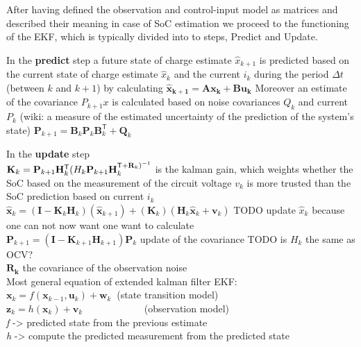 After having defined the observation and control-input model as matrices and described their meaning in case of SoC estimation we proceed to the functioning of the EKF, which is typically divided into to steps, Predict and Update. 

In the \textbf{predict} step a future state of charge estimate  $\hat x_{k+1}$ is predicted based on the current state of charge estimate $\hat x_k$ and the current $i_k$ during the period $\Delta t$ (between $k$ and $k+1$) by calculating $ \mathbf{\hat x_{k+1}=Ax_{k}+Bu_{k}} $ Moreover an estimate of the covariance $P_{k+1}x$ is calculated based on noise covariances $Q_k$ and current $P_k$ (wiki: a measure of the estimated uncertainty of the prediction of the system's state)  $\mathbf {P} _{k+1}=\mathbf {B} _{k}\mathbf {P} _{k}\mathbf {B} _{k}^{\textsf {T}}+\mathbf {Q} _{k} $

In the \textbf{update} step  \\
$ \mathbf {K} _{k}=\mathbf {P} _{k+1}\mathbf {H} _{k}^ \textsf {T} (  \mathbf \mathbf {H} _{k}\mathbf {P} _{k+1}\mathbf {H} _{k}^{\textsf {T}+\mathbf {R} _{k})^{-1}}$  is the kalman gain, which weights whether the SoC based on the measurement of the circuit voltage $v_k$ is more trusted than the SoC prediction based on current $i_k$ \\
$ {\hat {\mathbf {x} }}_{k}=(\mathbf {I} -\mathbf {K} _{k}\mathbf {H} _{k})({\hat {\mathbf {x} }}_{k+1})+(\mathbf {K} _{k})(\mathbf {H} _{k}\mathbf {\hat x} _{k}+\mathbf {v} _{k}) $ TODO update $\hat x_k$ because one can not now want one want to calculate\\  

$ \mathbf {P} _{k+1}=\left(\mathbf {I} -\mathbf {K} _{k+1}\mathbf {H} _{k+1}\right)\mathbf {P} _{k} $ update of the covariance TODO is $H_{k}$ the same as OCV? \\

$\mathbf{R_k}$ the covariance of the observation noise  \\

Most general equation of extended kalman filter EKF: \\

$ \mathbf {x}_{k}=f(\mathbf {x} _{k-1},\mathbf {u}_{k})+\mathbf {w}_{k}\ $ (state transition model) \\
$\mathbf {z}_{k}=h(\mathbf {x} _{k})+\mathbf {v}_{k}$ \ \ \ \ \ \ \ \ \ \ \  \ (observation model)  \\
\emph{f} ->  predicted state from the previous estimate  \\
\emph{h} ->  compute the predicted measurement from the predicted state \\



